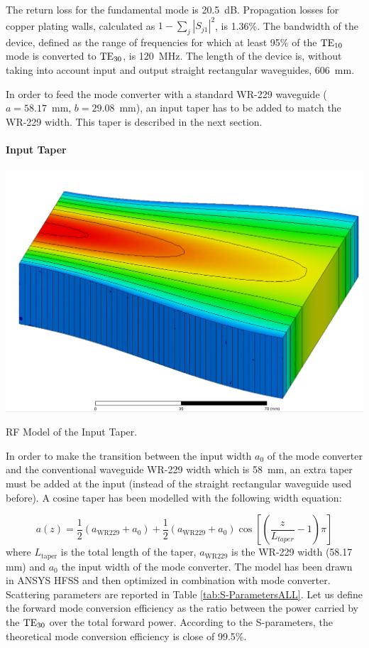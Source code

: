 {The return loss for the fundamental mode is 20.5~dB. Propagation losses for copper plating walls, calculated as $1-\sum_{j}\left|S_{j1}\right|^{2}$, is 1.36\%. The bandwidth of the device, defined as the range of frequencies for which at least 95\% of the ${\mathrm{TE}}_{10}$ mode is converted to ${\mathrm{TE}}_{30}$, is 120~MHz.
The length of the device is, without taking into account input and output straight rectangular waveguides, 606~mm.


In order to feed the mode converter with a standard WR-229 waveguide ($a=58.17$~mm, $b=29.08$~mm), 
an input taper has to be added to match the WR-229 width. This taper is described in the next section.

\paragraph{Input Taper}
\begin{marginfigure}
	\includegraphics[width=1.0\textwidth]{figures/chap3/ITER_modeconverter/HFSS_ModeConverterTaper}
	\caption{RF Model of the Input Taper. }
	\label{fig:taper}
\end{marginfigure}
In order to make the transition between the input width $a_{0}$ of the mode converter and the conventional waveguide WR-229 width which is 58~mm, an extra taper must be added at the input (instead of the straight rectangular waveguide used before). A cosine taper has been modelled with the following width equation:

\begin{equation}
a(z)=\frac{1}{2} 
\left(a_{\mbox{WR229}}+a_{0}\right)
+\frac{1}{2}\left(a_{\mbox{WR229}}+a_{0}\right)
\cos\left[\left(\frac{z}{L_{taper}}-1\right)\pi\right]
\end{equation}
where $L_{\mbox{taper}}$ is the total length of the taper, $a_{\mbox{WR229}}$ is the WR-229 width (58.17\,mm) and $a_{0}$ the input width of the mode converter. The model has been drawn in ANSYS HFSS and then optimized in combination with mode converter. Scattering parameters are reported in Table \ref{tab:S-ParametersALL}. Let us define the forward mode conversion efficiency as the ratio between the power carried by the ${\mathrm{TE}}_{30}$ over the total forward power. According to the S-parameters, the theoretical mode conversion efficiency is close of 99.5\%. 

}
